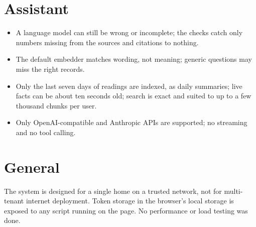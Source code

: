 \documentclass[12pt,a4paper,oneside]{report}
\begin{document}
\section{Assistant}
\begin{itemize}
  \item A language model can still be wrong or incomplete; the checks catch only numbers missing from the sources and citations to nothing.
  \item The default embedder matches wording, not meaning; generic questions may miss the right records.
  \item Only the last seven days of readings are indexed, as daily summaries; live facts can be about ten seconds old; search is exact and suited to up to a few thousand chunks per user.
  \item Only OpenAI-compatible and Anthropic APIs are supported; no streaming and no tool calling.
\end{itemize}

\section{General}
The system is designed for a single home on a trusted network, not for multi-tenant internet deployment. Token storage in the browser's local storage is exposed to any script running on the page. No performance or load testing was done.

\end{document}

